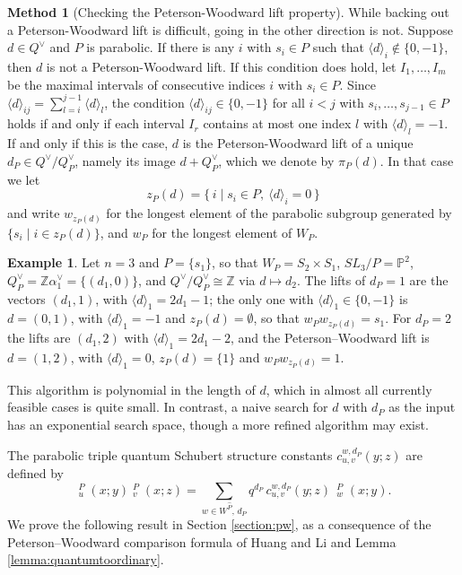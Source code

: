 \documentclass{amsart}
\theoremstyle{definition}
\newtheorem{example}[lemma]{Example}
\newtheorem{method}[lemma]{Method}
\theoremstyle{remark}
\numberwithin{equation}{section}
\DeclareMathOperator{\qsch}{\widetilde{\mathfrak{S}}}
\newcommand{\pcomp}[1]{\widehat{#1}}
\begin{document}
 \begin{method}[Checking the Peterson-Woodward lift property]
 While backing out a Peterson-Woodward lift is difficult, going in the other direction is not. Suppose $d\in Q^\vee$ and $P$ is parabolic. If there is any $i$ with $s_i\in P$ such that $\langle d\rangle_i\notin\{0,-1\}$, then $d$ is not a Peterson-Woodward lift. If this condition does hold, let $I_1,\ldots,I_m$ be the maximal intervals of consecutive indices $i$ with $s_i\in P$. Since $\langle d\rangle_{ij}=\sum_{l=i}^{j-1}\langle d\rangle_l$, the condition $\langle d\rangle_{ij}\in\{0,-1\}$ for all $i<j$ with $s_i,\ldots,s_{j-1}\in P$ holds if and only if each interval $I_r$ contains at most one index $l$ with $\langle d\rangle_l=-1$. If and only if this is the case, $d$ is the Peterson-Woodward lift of a unique $d_P\in Q^\vee/Q^\vee_P$, namely its image $d+Q^\vee_P$, which we denote by $\pi_P(d)$. In that case we let
$$z_P(d)=\{\,i\mid s_i\in P,\ \langle d\rangle_i=0\,\}$$
and write $w_{z_P(d)}$ for the longest element of the parabolic subgroup generated by $\{s_i\mid i\in z_P(d)\}$, and $w_P$ for the longest element of $W_P$. 
 \end{method}

 \begin{example}
 Let $n=3$ and $P=\{s_1\}$, so that $W_P=S_2\times S_1$, $SL_3/P=\mathbb P^2$, $Q^\vee_P=\mathbb Z\alpha_1^\vee=\{(d_1,0)\}$, and $Q^\vee/Q^\vee_P\cong\mathbb Z$ via $d\mapsto d_2$. The lifts of $d_P=1$ are the vectors $(d_1,1)$, with $\langle d\rangle_1=2d_1-1$; the only one with $\langle d\rangle_1\in\{0,-1\}$ is $d=(0,1)$, with $\langle d\rangle_1=-1$ and $z_P(d)=\emptyset$, so that $w_Pw_{z_P(d)}=s_1$. For $d_P=2$ the lifts are $(d_1,2)$ with $\langle d\rangle_1=2d_1-2$, and the Peterson--Woodward lift is $d=(1,2)$, with $\langle d\rangle_1=0$, $z_P(d)=\{1\}$ and $w_Pw_{z_P(d)}=1$.
 \end{example}

 This algorithm is polynomial in the length of $d$, which in almost all currently feasible cases is quite small. In contrast, a naive search for $d$ with $d_P$ as the input has an exponential search space, though a more refined algorithm may exist.

 The parabolic triple quantum Schubert structure constants $c_{u,v}^{w,d_P}(y;z)$ are defined by
$$\qsch^P_u(x;y)\qsch^P_v(x;z)=\sum_{w\in W^{\pcomp P},\,d_P}q^{d_P}\,c_{u,v}^{w,d_P}(y;z)\,\qsch^P_w(x;y).$$
We prove the following result in Section \ref{section:pw}, as a consequence of the Peterson--Woodward comparison formula of Huang and Li \cite{huang2015equivariant} and Lemma \ref{lemma:quantumtoordinary}.
\end{document}
